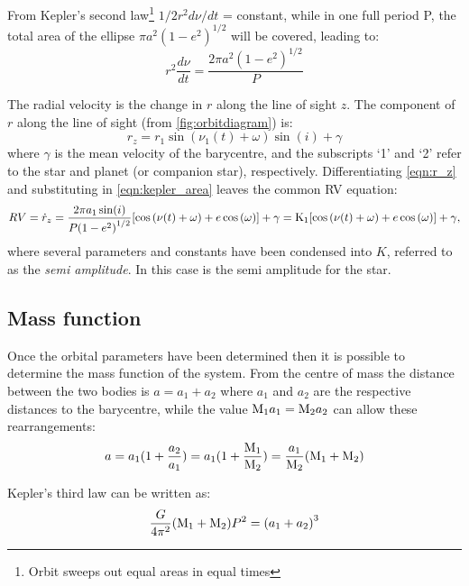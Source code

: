 From Kepler's second law\footnote{Orbit sweeps out equal areas in equal times} \(1/2 r^{2} d\nu/dt\) = constant, while in one full period P, the total area of the ellipse \(\pi a^{2}{(1 - e^{2})}^{1/2} \) will be covered, leading to: 
\begin{equation}
r^2 \frac{d\nu}{dt} = \frac{2\pi a^{2}(1-e^{2})^{1/2}}{P} \label{eqn:kepler_area}
\end{equation}

The radial velocity is the change in $r$ along the line of sight $z$.
The component of $r$ along the line of sight (from \cref{fig:orbitdiagram}) is:
\begin{equation}
   r_z =  r_1 \sin(\nu_1(t) + \omega)\sin(i) + \gamma \label{eqn:r_z}
\end{equation}
where $\gamma$ is the mean velocity of the barycentre, and the subscripts `1' and `2' refer to the star and planet (or companion star), respectively.
Differentiating \cref{eqn:r_z} and substituting in \cref{eqn:kepler_area} leaves the common RV equation:
\begin{equation}
\label{eqn:rv_equation}
{RV} = \dot{r}_z= \frac{2 \pi a_1 \sin(i)}{P{(1-e^{2})}^{1/2}} [\cos{(\nu(t) + \omega)} + e\cos{(\omega)}] + \gamma
     = \textrm{K}_{1} [\cos{(\nu(t) + \omega)} + e\cos{(\omega)}] + \gamma,
\end{equation}
where several parameters and constants have been condensed into $K$, referred to as the \emph{semi amplitude}.
In this case \Kone{} is the semi amplitude for the star.


\subsection{Mass function}
Once the orbital parameters have been determined then it is possible to determine the mass function of the system.
From the centre of mass the distance between the two bodies is \(a = a_1 + a_2\) where $a_1$ and $a_2$ are the respective distances to the barycentre, while the value \(\textrm{M}_{1} a_1 = \textrm{M}_{2} a_2\) can allow these rearrangements:
\begin{equation}
a = a_{1} (1 + \frac{a_{2}}{a_{1}}) = a_{1}(1 + \frac{\textrm{M}_{1}}{\textrm{M}_{2}}) = \frac{a_{1}}{\textrm{M}_{2}} (\textrm{M}_{1} + \textrm{M}_{2})
\end{equation}

Kepler's third law can be written as:
\begin{equation}
    \frac{G}{4\pi^{2}}(\textrm{M}_{1} + \textrm{M}_{2})P^{2} = {(a_1 + a_2)}^{3}
\end{equation}

